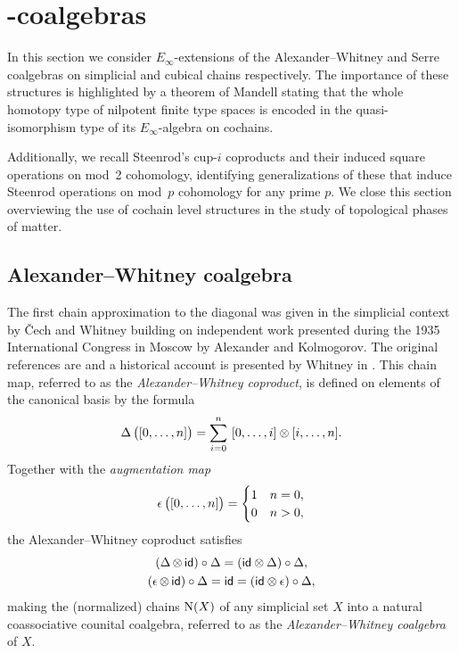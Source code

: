 
\section{\pdfEinfty-coalgebras} \label{s:integrally}

In this section we consider $E_\infty$-extensions of the Alexander--Whitney and Serre coalgebras on simplicial and cubical chains respectively.
The importance of these structures is highlighted by a theorem of Mandell \cite{mandell2006homotopy_type} stating that the whole homotopy type of nilpotent finite type spaces is encoded in the quasi-isomorphism type of its $E_\infty$-algebra on cochains.

Additionally, we recall Steenrod's cup-$i$ coproducts and their induced square operations on mod~2 cohomology, identifying generalizations of these that induce Steenrod operations on mod~$p$ cohomology for any prime $p$.
We close this section overviewing the use of cochain level structures in the study of topological phases of matter.

\subsection{Alexander--Whitney coalgebra} \label{ss:aw diagonal}

The first chain approximation to the diagonal was given in the simplicial context by \v{C}ech and Whitney building on independent work presented during the 1935 International Congress in Moscow by Alexander and Kolmogorov.
The original references are \cite{alexander1936ring, cech1936multiplication, whitney1938products} and a historical account is presented by Whitney in \cite[p.110]{whitney1988history}.
This chain map, referred to as the \textit{Alexander--Whitney coproduct}, is defined on elements of the canonical basis by the formula
\begin{equation} \label{e:alexander-whitney coalgebra}
	\operatorname{\Delta} \big( [0,\dots,n] \big) = \sum_{i=0}^n \ [0, \dots, i] \otimes [i, \dots, n].
\end{equation}
Together with the \textit{augmentation map}
\begin{equation} \label{e:augmentation map}
	\operatorname{\epsilon} \big( [0, \dots, n] \big) =
	\begin{cases}
		1 & n = 0, \\
		0 & n > 0,
	\end{cases}
\end{equation}
the Alexander--Whitney coproduct satisfies
\begin{gather}
	\label{e:coassociativity relation}
	(\operatorname{\Delta} \otimes \, \mathsf{id}) \circ \operatorname{\Delta} = (\mathsf{id} \otimes \operatorname{\Delta}) \circ \operatorname{\Delta}, \\
	\label{e:counital relation}
	(\operatorname{\epsilon} \otimes \, \mathsf{id}) \circ \operatorname{\Delta} = \mathsf{id} = (\mathsf{id} \otimes \operatorname{\epsilon}) \circ \operatorname{\Delta},
\end{gather}
making the (normalized) chains $\operatorname{N}(X)$ of any simplicial set $X$ into a natural coassociative counital coalgebra, referred to as the \textit{Alexander--Whitney coalgebra} of $X$.


